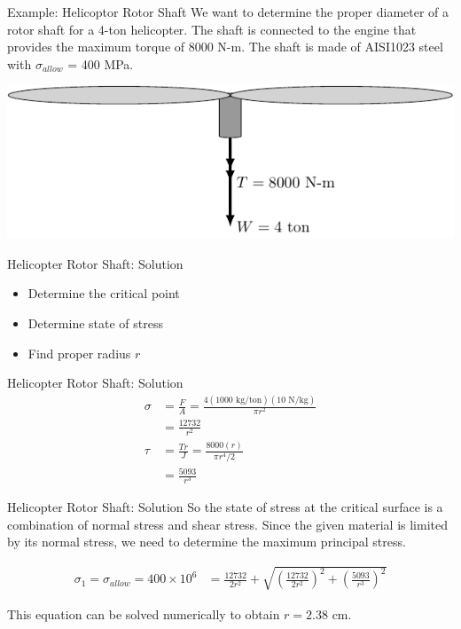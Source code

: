 \documentclass[10pt, svgnames]{beamer}
\begin{document}
\begin{frame}[label={sec:orgea650fc}]{Example: Helicoptor Rotor Shaft}
We want to determine the proper diameter of a rotor shaft for a 4-ton helicopter. The shaft is connected to the engine that provides the maximum torque of 8000 N-m. The shaft is made of AISI1023 steel with \(\sigma_{allow}\) = 400 MPa.

\begin{center}
\includegraphics[width=.9\linewidth]{pictures/helicopter-example.pdf}
\end{center}
\end{frame}

\begin{frame}[label={sec:orga226084}]{Helicopter Rotor Shaft: Solution}
\begin{itemize}
\item Determine the critical point
\item Determine state of stress
\item Find proper radius \(r\)
\end{itemize}
\end{frame}

\begin{frame}[label={sec:orgbb64ffc}]{Helicopter Rotor Shaft: Solution}
\begin{align*}
  \sigma &= \frac{F}{A} = \frac{4(1000 \text{ kg/ton})(10 \text{ N/kg})}{\pi r^2} \\
         &= \frac{12732}{r^2} \\
  \tau &= \frac{Tr}{J} = \frac{8000(r)}{\pi r^4/2} \\
         &= \frac{5093}{r^3}
\end{align*}
\end{frame}

\begin{frame}[label={sec:org3955ca0}]{Helicopter Rotor Shaft: Solution}
So the state of stress at the critical surface is a combination of normal stress and shear stress. Since the given material is limited by its normal stress, we need to determine the maximum principal stress.

\begin{align*}
\sigma_1 = \sigma_{allow} = 400 \times 10^6 &= \frac{12732}{2r^2} + \sqrt{ \left( \frac{12732}{2r^2} \right)^2 + \left( \frac{5093}{r^3} \right)^2 }
\end{align*}

This equation can be solved numerically to obtain \(r = 2.38\) cm.
\end{frame}
\end{document}
